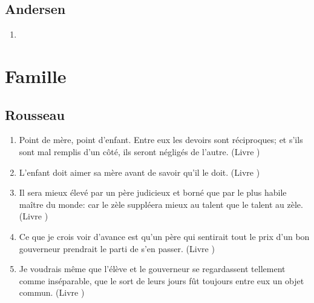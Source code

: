 \documentclass[a4paper, 11pt, hidelinks]{article}
\newcommand{\rb}[1]{\Romanbar{#1}}
\begin{document}
\subsection{Andersen}


\begin{enumerate}
    \item 
\end{enumerate}






































\section{Famille}



\subsection{Rousseau}


\begin{enumerate}
    \item Point de mère, point d'enfant. Entre eux les devoirs sont réciproques; et s'ils sont mal remplis d'un côté, ils seront négligés de l'autre. (Livre \rb{1})
    \item L'enfant doit aimer sa mère avant de savoir qu'il le doit. (Livre \rb{1})
    \item Il sera mieux élevé par un père judicieux et borné que par le plus habile maître du monde: car le zèle suppléera mieux au talent que le talent au zèle. (Livre \rb{1})
    \item Ce que je crois voir d'avance est qu'un père qui sentirait tout le prix d'un bon gouverneur prendrait le parti de s'en passer. (Livre \rb{1})
    \item Je voudrais même que l'élève et le gouverneur se regardassent tellement comme inséparable, que le sort de leurs jours fût toujours entre eux un objet commun. (Livre \rb{1})
\end{enumerate}
\end{document}
